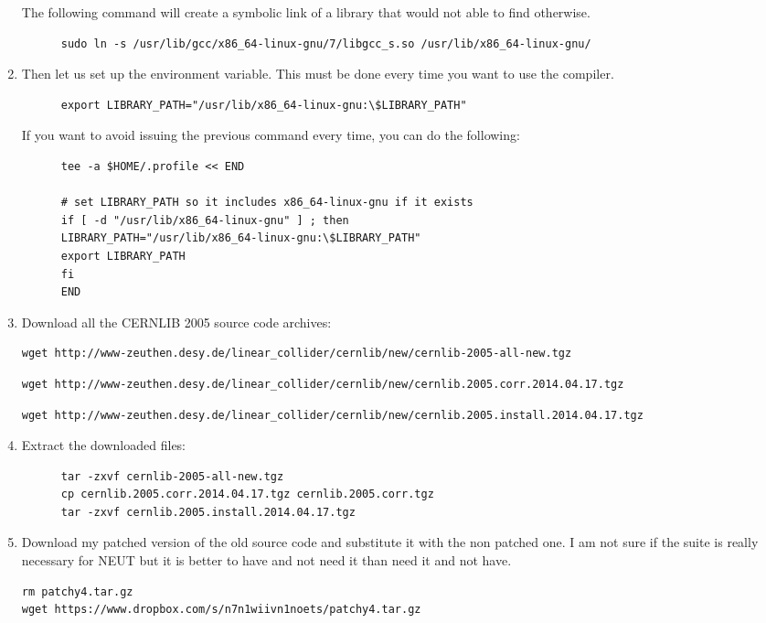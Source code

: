 \begin{enumerate}[resume]
  The following command will create a symbolic link of a library that
   would not able to find otherwise.
\begin{lstlisting}
      sudo ln -s /usr/lib/gcc/x86_64-linux-gnu/7/libgcc_s.so /usr/lib/x86_64-linux-gnu/
\end{lstlisting}
\item  Then let us set up the  environment
  variable. This must be done every time you want to use the
   compiler.
\begin{lstlisting}
      export LIBRARY_PATH="/usr/lib/x86_64-linux-gnu:\$LIBRARY_PATH"
\end{lstlisting}
If you want to avoid issuing the previous command every time, you can
do the following:
\begin{lstlisting}
      tee -a $HOME/.profile << END

      # set LIBRARY_PATH so it includes x86_64-linux-gnu if it exists
      if [ -d "/usr/lib/x86_64-linux-gnu" ] ; then
      LIBRARY_PATH="/usr/lib/x86_64-linux-gnu:\$LIBRARY_PATH"
      export LIBRARY_PATH
      fi
      END
\end{lstlisting}
  
\item Download all the CERNLIB 2005 source code archives:%
\begin{lstlisting}
wget http://www-zeuthen.desy.de/linear_collider/cernlib/new/cernlib-2005-all-new.tgz
\end{lstlisting}
 \begin{lstlisting} 
wget http://www-zeuthen.desy.de/linear_collider/cernlib/new/cernlib.2005.corr.2014.04.17.tgz
\end{lstlisting}
\begin{lstlisting}
wget http://www-zeuthen.desy.de/linear_collider/cernlib/new/cernlib.2005.install.2014.04.17.tgz
\end{lstlisting}
\item Extract the downloaded files:
\begin{lstlisting}
      tar -zxvf cernlib-2005-all-new.tgz
      cp cernlib.2005.corr.2014.04.17.tgz cernlib.2005.corr.tgz
      tar -zxvf cernlib.2005.install.2014.04.17.tgz
\end{lstlisting}

\item Download my patched version of the old 
  source code and substitute it with the non patched one. I am not
  sure if the  suite is really necessary for NEUT
  but it is better to have and not need it than need it and not have.
\begin{lstlisting}
rm patchy4.tar.gz
wget https://www.dropbox.com/s/n7n1wiivn1noets/patchy4.tar.gz
\end{lstlisting}


\end{enumerate}
